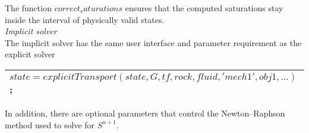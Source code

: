 \documentclass[a4paper,10pt]{report}
\begin{document}
The function $correct_saturations$ ensures that the computed saturations
stay inside the interval of physically valid states. \\
\emph{Implicit solver}\\
The implicit solver has the same user interface and parameter requirement as
the explicit solver
\begin{table}[!ht]
\centering
\begin{tabular}{ |l |} 
\hline
$state = explicitTransport(state, G, tf, rock, fluid, 'mech1', obj1, ...)$;\\
 \hline
\end{tabular}
\label{table:etransp}
\end{table} 
In addition, there are optional parameters that control the Newton–Raphson
method used to solve for $S ^{n+1}$. 




\end{document}

